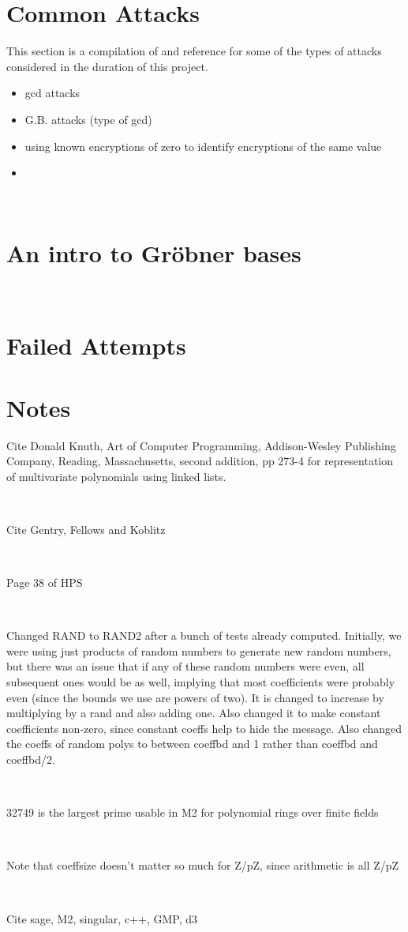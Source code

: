 \documentclass[11pt]{report}
\begin{document}
\section{Common Attacks}

This section is a compilation of and reference for some of the types of attacks considered in the duration of this project.

\begin{itemize}
\item gcd attacks
\item G.B. attacks (type of gcd)
\item using known encryptions of zero to identify encryptions of the same value
\item
\end{itemize}

\

\section{An intro to Gr\"obner bases}

\

\section{Failed Attempts}

\section{Notes}
Cite Donald Knuth, Art of Computer Programming, Addison-Wesley Publishing Company, Reading, Massachusetts, second addition, pp 273-4 for representation of multivariate polynomials using linked lists.

\

Cite Gentry, Fellows and Koblitz

\

Page 38 of HPS

\

Changed RAND to RAND2 after a bunch of tests already computed. Initially, we were using just products of random numbers to generate new random numbers, but there was an issue that if any of these random numbers were even, all subsequent ones would be as well, implying that most coefficients were probably even (since the bounds we use are powers of two). It is changed to increase by multiplying by a rand and also adding one. Also changed it to make constant coefficients non-zero, since constant coeffs help to hide the message. Also changed the coeffs of random polys to between coeffbd and 1 rather than coeffbd and coeffbd/2.

\

32749 is the largest prime usable in M2 for polynomial rings over finite fields

\

Note that coeffsize doesn't matter so much for Z/pZ, since arithmetic is all Z/pZ

\

Cite sage, M2, singular, c++, GMP, d3
\end{document}

